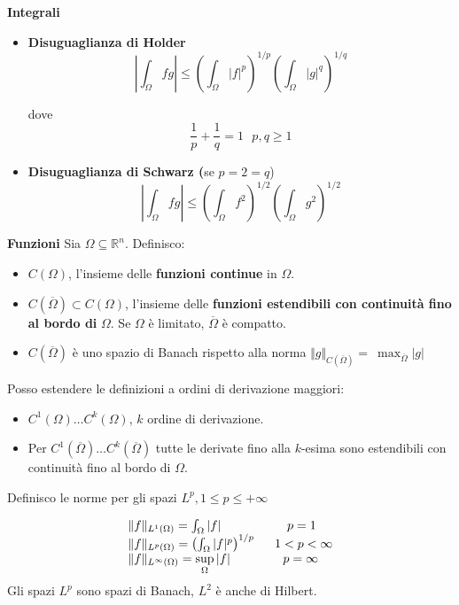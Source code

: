 \textbf{Integrali}
\begin{itemize}
    \item \textbf{Disuguaglianza di Holder}
          \begin{equation*}
              \left| \int _{\Omega } fg\right| \leq \left(\int _{\Omega }| f| ^{p}\right)^{1/p}\left(\int _{\Omega }| g| ^{q}\right)^{1/q}
          \end{equation*}

          dove \begin{equation*}
              \frac{1}{p} +\frac{1}{q} =1\ \ \ p,q\geq 1
          \end{equation*}
    \item \textbf{Disuguaglianza di Schwarz (}se $p=2=q$) \begin{equation*}
              \left| \int _{\Omega } fg\right| \leq \left(\int _{\Omega } f^{2}\right)^{1/2}\left(\int _{\Omega } g^{2}\right)^{1/2}
          \end{equation*}
\end{itemize}

\textbf{Funzioni}
Sia $\Omega \subseteq \mathbb{R}^{n}$. Definisco:
\begin{itemize}
    \item $C(\Omega)$, l'insieme delle \textbf{funzioni continue} in $\Omega $.
    \item $C(\overline{\Omega }) \subset C(\Omega)$, l'insieme delle \textbf{funzioni estendibili con continuità fino al bordo di} $\Omega $. Se $\Omega $ è limitato, $\overline{\Omega }$ è compatto.
    \item $C(\overline{\Omega })$ è uno spazio di Banach rispetto alla norma $\Vert g\Vert _{C(\overline{\Omega })} =\ \max_{\overline{\Omega }}| g| $
\end{itemize}

Posso estendere le definizioni a ordini di derivazione maggiori:
\begin{itemize}
    \item $C^{1}(\Omega) \dotsc C^{k}(\Omega)$, $k$ ordine di derivazione.
    \item Per $C^{1}(\overline{\Omega }) \dotsc C^{k}(\overline{\Omega })$ tutte le derivate fino alla $k$-esima sono estendibili con continuità fino al bordo di $\displaystyle \Omega $.
\end{itemize}

Definisco le norme per gli spazi $L^{p},1\leq p\leq +\infty $

\begin{equation*}
    \begin{array}{ l l }
        \Vert f\Vert _{L^{1}(\Omega)} =\int _{\Omega }| f|                            & \ \ \ \ p=1    \\
        \Vert f\Vert _{L^{p}(\Omega)} =\left(\int _{\Omega }| f| ^{p}\right)^{1/p} \  & \ 1< p< \infty \\
        \Vert f\Vert _{L^{\infty }(\Omega)} =\sup\limits _{\Omega }| f|               & \ \ \ p=\infty
    \end{array}
\end{equation*}
Gli spazi $\displaystyle L^{p}$ sono spazi di Banach, $\displaystyle L^{2}$ è anche di Hilbert.

